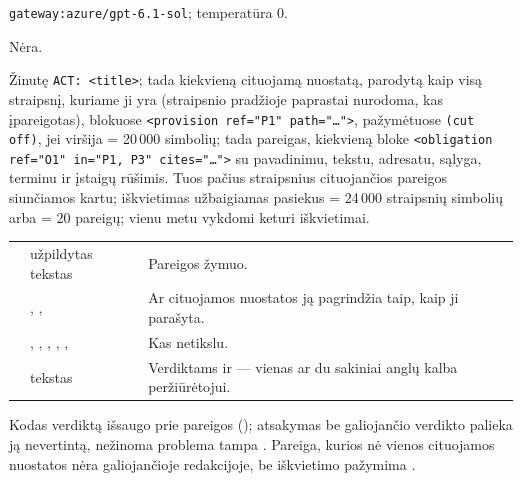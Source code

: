  \texttt{gateway:azure/gpt-6.1-sol}; temperatūra 0.

 Nėra.

 Žinutę \texttt{ACT: <title>}; tada kiekvieną cituojamą
nuostatą, parodytą kaip visą straipsnį, kuriame ji yra (straipsnio pradžioje paprastai
nurodoma, kas įpareigotas), blokuose \texttt{<provision ref="P1" path="…">}, pažymėtuose
\texttt{(cut off)}, jei viršija  = 20\,000 simbolių; tada pareigas,
kiekvieną bloke \texttt{<obligation ref="O1" in="P1, P3" cites="…">} su pavadinimu, tekstu,
adresatu, sąlyga, terminu ir įstaigų rūšimis. Tuos pačius straipsnius cituojančios pareigos
siunčiamos kartu; iškvietimas užbaigiamas pasiekus  = 24\,000 straipsnių
simbolių arba  = 20 pareigų; vienu metu vykdomi keturi iškvietimai.

\par\nopagebreak
\begin{xltabular}{\textwidth}{@{}L{38mm}L{40mm}Y@{}}
\toprule
{} &  &  \\
\midrule
\endhead
\bottomrule
\endlastfoot
{} & užpildytas tekstas & Pareigos žymuo. \\
 & , ,  & Ar cituojamos nuostatos ją pagrindžia taip, kaip ji parašyta. \\
 & , , , , ,  & Kas netikslu. \\
 & tekstas & Verdiktams  ir  --- vienas ar du sakiniai anglų kalba peržiūrėtojui. \\
\end{xltabular}

Kodas verdiktą išsaugo prie pareigos (); atsakymas be galiojančio verdikto
palieka ją nevertintą, nežinoma problema tampa . Pareiga, kurios nė vienos cituojamos
nuostatos nėra galiojančioje redakcijoje, be iškvietimo pažymima .

